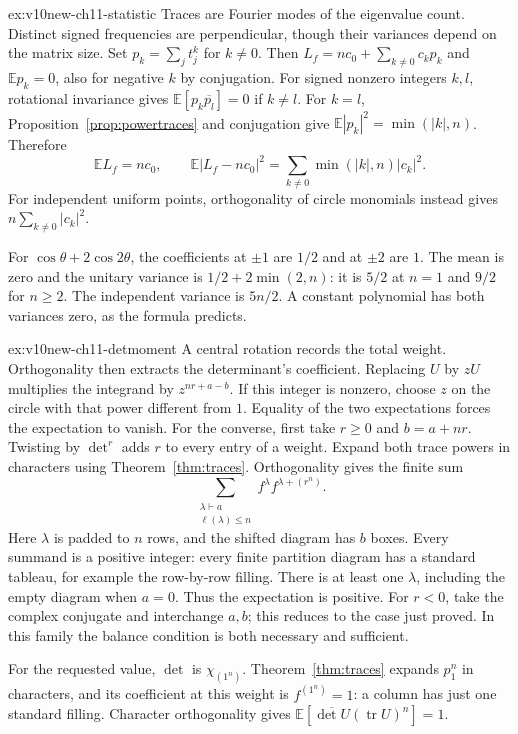 \begin{solution}{ex:v10new-ch11-statistic}
\idea Traces are Fourier modes of the eigenvalue count. Distinct signed frequencies are perpendicular, though their variances depend on the matrix size.
\writeup Set $p_k=\sum_jt_j^k$ for $k\ne0$. Then
$L_f=nc_0+\sum_{k\ne0}c_kp_k$ and $\mathbb E p_k=0$, also for negative $k$ by conjugation. For signed nonzero integers $k,l$, rotational invariance gives
$\mathbb E[p_k\overline{p_l}]=0$ if $k\ne l$.
For $k=l$, Proposition~\ref{prop:powertraces} and conjugation give $\mathbb E|p_k|^2=\min(|k|,n)$. Therefore
\[
\mathbb E L_f=nc_0,\qquad
\mathbb E|L_f-nc_0|^2=\sum_{k\ne0}\min(|k|,n)|c_k|^2.
\]
For independent uniform points, orthogonality of circle monomials instead gives $n\sum_{k\ne0}|c_k|^2$.

For $\cos\theta+2\cos2\theta$, the coefficients at $\pm1$ are $1/2$ and at $\pm2$ are $1$. The mean is zero and the unitary variance is $1/2+2\min(2,n)$: it is $5/2$ at $n=1$ and $9/2$ for $n\ge2$. The independent variance is $5n/2$. A constant polynomial has both variances zero, as the formula predicts.
\end{solution}

\begin{solution}{ex:v10new-ch11-detmoment}
\idea A central rotation records the total weight. Orthogonality then extracts the determinant's coefficient.
\writeup Replacing $U$ by $zU$ multiplies the integrand by $z^{nr+a-b}$. If this integer is nonzero, choose $z$ on the circle with that power different from $1$. Equality of the two expectations forces the expectation to vanish. For the converse, first take $r\ge0$ and $b=a+nr$. Twisting by $\det^r$ adds $r$ to every entry of a weight. Expand both trace powers in characters using Theorem~\ref{thm:traces}. Orthogonality gives the finite sum
\[
\sum_{\substack{\lambda\vdash a\\\ell(\lambda)\le n}}
f^\lambda f^{\lambda+(r^n)}.
\]
Here $\lambda$ is padded to $n$ rows, and the shifted diagram has $b$ boxes. Every summand is a positive integer: every finite partition diagram has a standard tableau, for example the row-by-row filling. There is at least one $\lambda$, including the empty diagram when $a=0$. Thus the expectation is positive. For $r<0$, take the complex conjugate and interchange $a,b$; this reduces to the case just proved. In this family the balance condition is both necessary and sufficient.

For the requested value, $\det$ is $\chi_{(1^n)}$. Theorem~\ref{thm:traces} expands $p_1^n$ in characters, and its coefficient at this weight is $f^{(1^n)}=1$: a column has just one standard filling. Character orthogonality gives
$\mathbb E[\overline{\det U}(\operatorname{tr}U)^n]=1$.
\end{solution}

